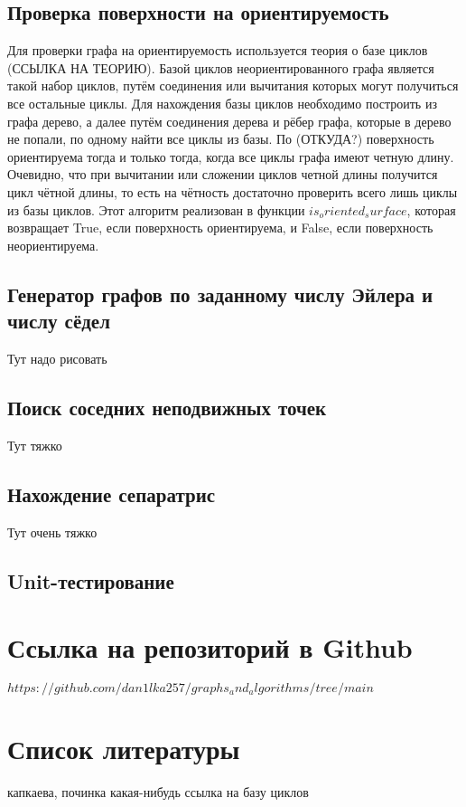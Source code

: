 	\subsection{Проверка поверхности на ориентируемость}
	Для проверки графа на ориентируемость используется теория о базе циклов (ССЫЛКА НА ТЕОРИЮ). Базой циклов неориентированного графа является такой набор циклов, путём соединения или вычитания которых могут получиться все остальные циклы. Для нахождения базы циклов необходимо построить из графа дерево, а далее путём соединения дерева и рёбер графа, которые в дерево не попали, по одному найти все циклы из базы. По (ОТКУДА?) поверхность ориентируема тогда и только тогда, когда все циклы графа имеют четную длину. Очевидно, что при вычитании или сложении циклов четной длины получится цикл чётной длины, то есть на чётность достаточно проверить всего лишь циклы из базы циклов. Этот алгоритм реализован в функции $is_oriented_surface$, которая возвращает True, если поверхность ориентируема, и False, если поверхность неориентируема.
	\subsection{Генератор графов по заданному числу Эйлера и числу сёдел}
	Тут надо рисовать
	\subsection{Поиск соседних неподвижных точек}
	Тут тяжко
	\subsection{Нахождение сепаратрис}
	Тут очень тяжко
	\subsection{Unit-тестирование}
	\section{Ссылка на репозиторий в Github}
	$https://github.com/dan1lka257/graphs_and_algorithms/tree/main$
	\section{Список литературы}
	капкаева, починка
	какая-нибудь ссылка на базу циклов

